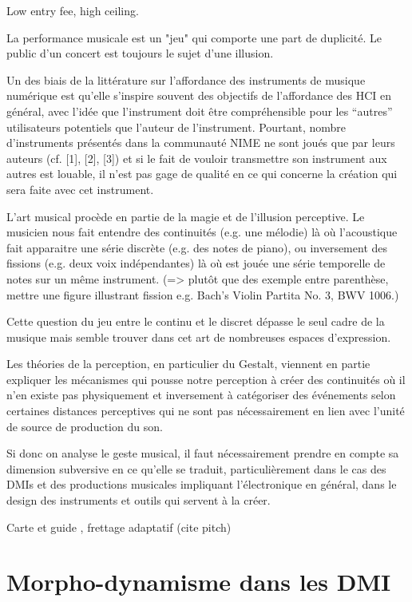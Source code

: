 Low entry fee, high ceiling.

La performance musicale est un "jeu" qui comporte une part de duplicité. Le public d'un concert est toujours le sujet d'une illusion. 

Un des biais de la littérature sur l’affordance des instruments de musique numérique est qu’elle s’inspire souvent des objectifs de l’affordance des HCI en général, avec l’idée que l’instrument doit être compréhensible pour les “autres” utilisateurs potentiels que l’auteur de l’instrument. Pourtant, nombre d’instruments présentés dans la communauté NIME ne sont joués que par leurs auteurs (cf. [1], [2], [3]) et si le fait de vouloir transmettre son instrument aux autres est louable, il n’est pas gage de qualité en ce qui concerne la création qui sera faite avec cet instrument.     


L'art musical procède en partie de la magie et de l'illusion perceptive. Le musicien nous fait entendre des continuités (e.g. une mélodie) là où l'acoustique fait apparaitre une série discrète (e.g. des notes de piano), ou inversement des fissions (e.g. deux voix indépendantes) là où est jouée une série temporelle de notes sur un même instrument. (=> plutôt que des exemple entre parenthèse, mettre une figure illustrant fission e.g. Bach's Violin Partita No. 3, BWV 1006.)

Cette question du jeu entre le continu et le discret dépasse le seul cadre de la musique mais semble trouver dans cet art de nombreuses espaces d'expression.

Les théories de la perception, en particulier du Gestalt, viennent en partie expliquer les mécanismes qui pousse notre perception à créer des continuités où il n'en existe pas physiquement et inversement à catégoriser des événements selon certaines distances perceptives qui ne sont pas nécessairement en lien avec l'unité de source de production du son.

Si donc on analyse le geste musical, il faut nécessairement prendre en compte sa dimension subversive en ce qu'elle se traduit, particulièrement dans le cas des DMIs et des productions musicales impliquant l'électronique en général, dans le design des instruments et outils qui servent à la créer.

\cite{bin_show_2018}

Carte et guide , frettage adaptatif (cite pitch)

\section{Morpho-dynamisme dans les DMI}


